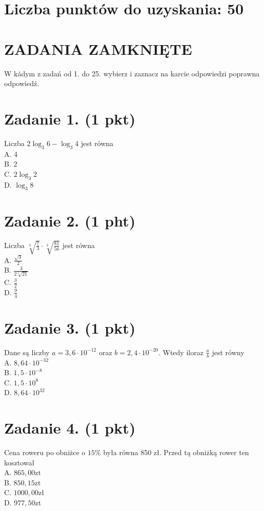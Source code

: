 \documentclass[10pt]{article}
\begin{document}
\section*{Liczba punktów do uzyskania: 50}
\section*{ZADANIA ZAMKNIĘTE}
W kȧ̇dym z zadań od 1. do 25. wybierz i zaznacz na karcie odpowiedzi poprawna odpowiedź.

\section*{Zadanie 1. (1 pkt)}
Liczba \(2 \log _{3} 6-\log _{3} 4\) jest równa\\
A. 4\\
B. 2\\
C. \(2 \log _{3} 2\)\\
D. \(\log _{3} 8\)

\section*{Zadanie 2. (1 pht)}
Liczba \(\sqrt[3]{\frac{7}{3}} \cdot \sqrt[3]{\frac{81}{56}}\) jest równa\\
A. \(\frac{\sqrt{3}}{2}\)\\
B. \(\frac{3}{2 \sqrt[3]{21}}\)\\
C. \(\frac{3}{2}\)\\
D. \(\frac{9}{4}\)

\section*{Zadanie 3. (1 pkt)}
Dane są liczby \(a=3,6 \cdot 10^{-12}\) oraz \(b=2,4 \cdot 10^{-20}\). Wtedy iloraz \(\frac{a}{b}\) jest równy\\
A. \(8,64 \cdot 10^{-32}\)\\
B. \(1,5 \cdot 10^{-8}\)\\
C. \(1,5 \cdot 10^{8}\)\\
D. \(8,64 \cdot 10^{32}\)

\section*{Zadanie 4. (1 pkt)}
Cena roweru po obniżce o \(15 \%\) była równa 850 zł. Przed tą obniżką rower ten kosztował\\
A. \(865,00 \mathrm{zt}\)\\
B. \(850,15 \mathrm{zt}\)\\
C. \(1000,00 \mathrm{zł}\)\\
D. \(977,50 \mathrm{zt}\)
\end{document}
